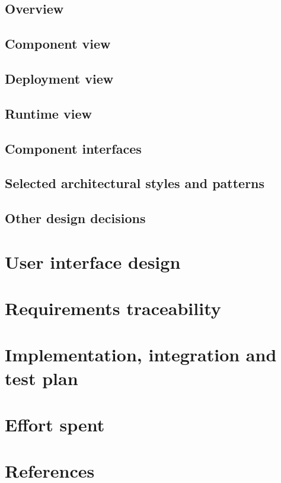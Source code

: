 \documentclass[12pt, a4paper]{report}
\begin{document}
    \section{Overview}
    \section{Component view}
    \section{Deployment view}
    \section{Runtime view}
    \section{Component interfaces}
    \section{Selected architectural styles and patterns}
    \section{Other design decisions}

\newpage 

\chapter{User interface design}

\newpage 

\chapter{Requirements traceability}

\newpage 

\chapter{Implementation, integration and test plan}

\newpage 

\chapter{Effort spent}

\newpage 

\chapter{References}
\end{document}
